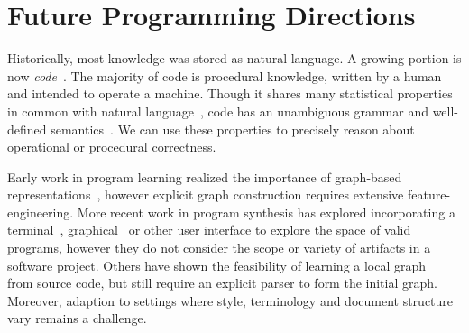 \documentclass[12pt]{article}
\newcommand*\circled[1]{\tikz[baseline=-0.1cm]{\node[shape=circle,draw,inner sep=0.48pt] (char) {\fontsize{7}{12}\textsf{#1}};}}
\begin{document}
%
%

\section{Future Programming Directions}

Historically, most knowledge was stored as natural language. A growing portion is now \textit{code}~\cite{allamanis2018survey}. The majority of code is procedural knowledge, written by a human and intended to operate a machine. Though it shares many statistical properties in common with natural language~\cite{hindle2012naturalness}, code has an unambiguous grammar and well-defined semantics~\cite{pierce2010software}. We can use these properties to precisely reason about operational or procedural correctness.

Early work in program learning realized the importance of graph-based representations~\cite{allamanis2017learning}, however explicit graph construction requires extensive feature-engineering. More recent work in program synthesis has explored incorporating a terminal~\cite{ellis2019write}, graphical~\cite{walke2020learning} or other user interface to explore the space of valid programs, however they do not consider the scope or variety of artifacts in a software project. Others have shown the feasibility of learning a local graph~\cite{johnson2020learning} from source code, but still require an explicit parser to form the initial graph. Moreover, adaption to settings where style, terminology and document structure vary remains a challenge.
\end{document}
